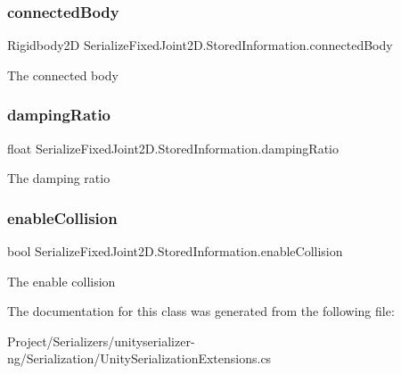 \subsubsection{\texorpdfstring{connected\+Body}{connectedBody}}
{\footnotesize\ttfamily Rigidbody2D Serialize\+Fixed\+Joint2\+D.\+Stored\+Information.\+connected\+Body}



The connected body 

\mbox{\label{class_serialize_fixed_joint2_d_1_1_stored_information_a38dadcba194381edf34f029271c59605}} 
\subsubsection{\texorpdfstring{damping\+Ratio}{dampingRatio}}
{\footnotesize\ttfamily float Serialize\+Fixed\+Joint2\+D.\+Stored\+Information.\+damping\+Ratio}



The damping ratio 

\mbox{\label{class_serialize_fixed_joint2_d_1_1_stored_information_a36d8055ea834af25f36f5a4e0f2d29e2}} 
\subsubsection{\texorpdfstring{enable\+Collision}{enableCollision}}
{\footnotesize\ttfamily bool Serialize\+Fixed\+Joint2\+D.\+Stored\+Information.\+enable\+Collision}



The enable collision 



The documentation for this class was generated from the following file\+:\begin{DoxyCompactItemize}
\item 
Project/\+Serializers/unityserializer-\/ng/\+Serialization/Unity\+Serialization\+Extensions.\+cs\end{DoxyCompactItemize}

